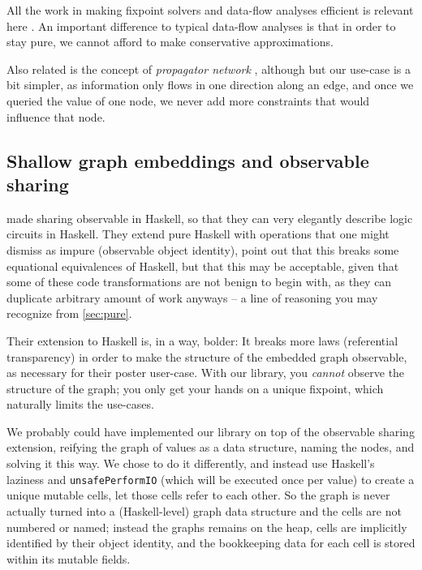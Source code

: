 \documentclass[manuscript,screen,acmsmall]{acmart}
\begin{document}
All the work in making fixpoint solvers and data-flow analyses efficient is relevant here \citep{kildall-73,kam-ullman-76}. An important difference to typical data-flow analyses is that in order to stay pure, we cannot afford to make conservative approximations.

Also related is the concept of \emph{propagator network} \citep{propagator}, although but our use-case is a bit simpler, as information only flows in one direction along an edge, and once we queried the value of one node, we never add more constraints that would influence that node.

%

\subsection{Shallow graph embeddings and observable sharing}

 made sharing observable in Haskell, so that they can very elegantly describe logic circuits in Haskell. They extend pure Haskell with operations that one might dismiss as impure (observable object identity), point out that this breaks some equational equivalences of Haskell, but that this may be acceptable, given that some of these code transformations are not benign to begin with, as they can duplicate arbitrary amount of work anyways -- a line of reasoning you may recognize from \cref{sec:pure}.

Their extension to Haskell is, in a way, bolder: It breaks more laws (referential transparency) in order to make the structure of the embedded graph observable, as necessary for their poster user-case. With our library, you \emph{cannot} observe the structure of the graph; you only get your hands on a unique fixpoint, which naturally limits the use-cases.

We probably could have implemented our library on top of the observable sharing extension, reifying the graph of values as a data structure, naming the nodes, and solving it this way. We chose to do it differently, and instead use Haskell's laziness and \verb|unsafePerformIO| (which will be executed once per value) to create a unique mutable cells, let those cells refer to each other. So the graph is never actually turned into a (Haskell-level) graph data structure and the cells are not numbered or named; instead the graphs remains on the heap, cells are implicitly identified by their object identity, and the bookkeeping data for each cell is stored within its mutable fields.
\end{document}
